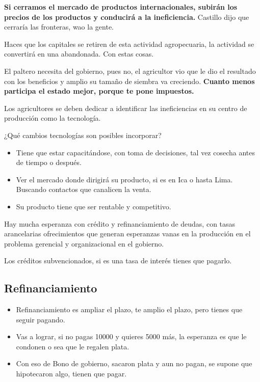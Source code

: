 \documentclass[
  letterpaper,
  DIV=11,
  numbers=noendperiod]{scrartcl}
\begin{document}
\textbf{Si cerramos el mercado de productos internacionales, subirán los
precios de los productos y conducirá a la ineficiencia.} Castillo dijo
que cerraría las fronteras, wao la gente.

Haces que los capitales se retiren de esta actividad agropecuaria, la
actividad se convertirá en una abandonada. Con estas cosas.

El paltero necesita del gobierno, pues no, el agricultor vio que le dio
el resultado con los beneficios y amplio su tamaño de siembra va
creciendo. \textbf{Cuanto menos participa el estado mejor, porque te
pone impuestos.}

Los agricultores se deben dedicar a identificar las ineficiencias en su
centro de producción como la tecnología.

¿Qué cambios tecnologías son posibles incorporar?

\begin{itemize}
\item
  Tiene que estar capacitándose, con toma de decisiones, tal vez cosecha
  antes de tiempo o después.
\item
  Ver el mercado donde dirigirá su producto, si es en Ica o hasta Lima.
  Buscando contactos que canalicen la venta.
\item
  Su producto tiene que ser rentable y competitivo.
\end{itemize}

Hay mucha esperanza con crédito y refinanciamiento de deudas, con tasas
arancelarias ofrecimientos que generan esperanzas vanas en la producción
en el problema gerencial y organizacional en el gobierno.

Los créditos subvencionados, si es una tasa de interés tienes que
pagarlo.

\hypertarget{refinanciamiento}{%
\subsection{Refinanciamiento}\label{refinanciamiento}}

\begin{itemize}
\item
  Refinanciamiento es ampliar el plazo, te amplio el plazo, pero tienes
  que seguir pagando.
\item
  Vas a lograr, si no pagas 10000 y quieres 5000 más, la esperanza es
  que le condonen o sea que le regalen plata.
\item
  Con eso de Bono de gobierno, sacaron plata y aun no pagan, se supone
  que hipotecaron algo, tienen que pagar.
\end{itemize}
\end{document}
